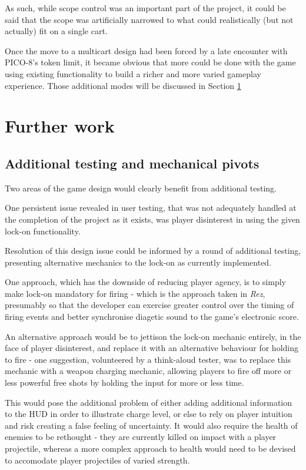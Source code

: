 \documentclass[11pt]{article}
\begin{document}
As such, while scope control was an important part of the project, it could be said that the
scope was artificially narrowed to what could realistically (but not actually) fit on a single cart.

Once the move to a multicart design had been forced by a late encounter with PICO-8's token limit,
it became obvious that more could be done with the game using existing functionality to build a richer
and more varied gameplay experience. Those additional modes will be discussed in Section \ref{furtherwork}

\section{Further work}\label{furtherwork}

\subsection{Additional testing and mechanical pivots}\label{additionaltests}

Two areas of the game design would clearly benefit from additional testing.

One persistent issue revealed in user testing, that was not adequately handled at the completion of
the project as it exists, was player disinterest in using the given lock-on functionality.

Resolution of this design issue could be informed by a round of additional testing, presenting
alternative mechanics to the lock-on as currently implemented.

One approach, which has the downside
of reducing player agency, is to simply make lock-on mandatory for firing - which is the approach
taken in \textit{Rez}, presumably so that the developer can exercise greater control over the timing
of firing events and better synchronise diagetic sound to the game's electronic score.

An alternative approach would be to jettison the lock-on mechanic entirely, in the face of
player disinterest, and replace it with an alternative behaviour for holding to fire - one
suggestion, volunteered by a think-aloud tester, was to replace this mechanic with a weapon
charging mechanic, allowing players to fire off more or less powerful free shots by holding
the input for more or less time.

This would pose the additional problem of either adding
additional information to the HUD in order to illustrate charge level, or else to rely on
player intuition and risk creating a false feeling of uncertainty. It would also require
the health of enemies to be rethought - they are currently killed on impact with
a player projectile, whereas a more complex approach to health would need to be devised
to accomodate player projectiles of varied strength.
\end{document}
